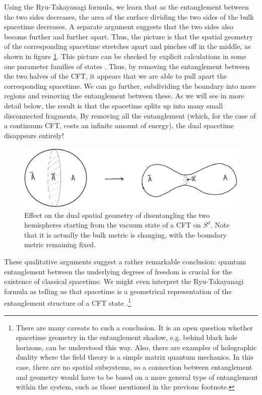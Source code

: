 \documentclass[12pt,epsf]{article}
\begin{document}
Using the Ryu-Takayanagi formula, we learn that as the entanglement between the two sides decreases, the area of the surface dividing the two sides of the bulk spacetime decreases. A separate argument suggests that the two sides also become further and further apart. Thus, the picture is that the spatial geometry of the corresponding spacetime stretches apart and pinches off in the middle, as shown in figure \ref{Thoughtexpt}. This picture can be checked by explicit calculations in some one parameter families of states \cite{Czech:2012be}. Thus, by removing the entanglement between the two halves of the CFT, it appears that we are able to pull apart the corresponding spacetime. We can go further, subdividing the boundary into more regions and removing the entanglement between these. As we will see in more detail below, the result is that the spacetime splits up into many small disconnected fragments. By removing all the entanglement (which, for the case of a continuum CFT, costs an infinite amount of energy), the dual spacetime disappears entirely!

\begin{figure}
\centering
\includegraphics[width = 0.8 \textwidth]{Thoughtexpt.eps}
\caption{Effect on the dual spatial geometry of disentangling the two hemispheres starting from the vacuum state of a CFT on $S^d$. Note that it is actually the bulk metric is changing, with the boundary metric remaining fixed.}
\label{Thoughtexpt}
\end{figure}

These qualitative arguments suggest a rather remarkable conclusion: quantum entanglement between the underlying degrees of freedom is crucial for the existence of classical spacetime. We might even interpret the Ryu-Takayanagi formula as telling us that spacetime is a geometrical representation of the entanglement structure of a CFT state \cite{Swingle:2009bg,VanRaamsdonk:2009ar}.\footnote{There are many caveats to such a conclusion. It is an open question whether spacetime geometry in the entanglement shadow, e.g. behind black hole horizons, can be understood this way. Also, there are examples of holographic duality where the field theory is a simple matrix quantum mechanics. In this case, there are no spatial subsystems, so a connection between entanglement and geometry would have to be based on a more general type of entanglement within the system, such as those mentioned in the previous footnote.}
\end{document}
